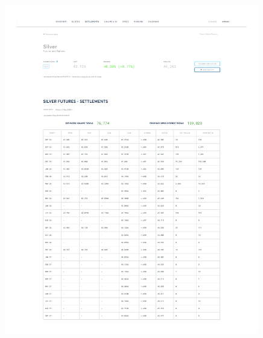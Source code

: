 \documentclass[11pt,a4paper]{article} %
\begin{document}
\begin{figure}[h]
  \centering
  \includegraphics[width=0.99\textwidth]{appendix/SILVER12SEP.pdf}
  \label{fig:silver_settlements}
\end{figure}
\end{document}

